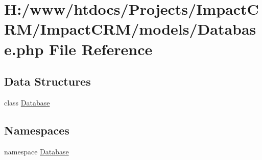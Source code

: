 \hypertarget{Database_8php}{
\section{H:/www/htdocs/Projects/ImpactCRM/ImpactCRM/models/Database.php File Reference}
\label{Database_8php}
}
\subsection*{Data Structures}
\begin{DoxyCompactItemize}
\item 
class \hyperlink{classDatabase}{Database}
\end{DoxyCompactItemize}
\subsection*{Namespaces}
\begin{DoxyCompactItemize}
\item 
namespace \hyperlink{namespaceDatabase}{Database}
\end{DoxyCompactItemize}
